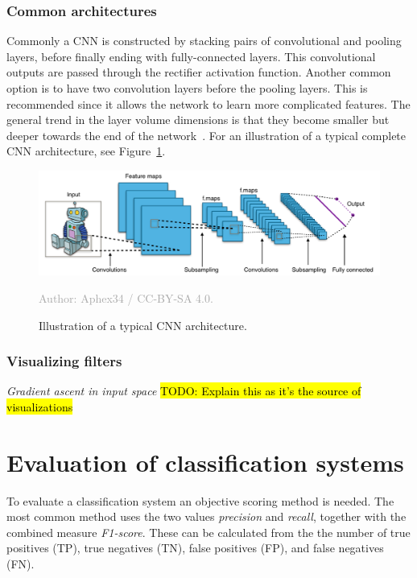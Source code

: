 \documentclass{kththesis}
\newcommand{\source}[1]{\vspace{-5mm}\caption*{\textcolor{darkgray}{Author: {#1}}\vspace{-7mm}} }
\begin{document}
\subsubsection{Common architectures}
Commonly a CNN is constructed by stacking pairs of convolutional and pooling layers, before finally ending with fully-connected layers. This convolutional outputs are passed through the rectifier activation function. Another common option is to have two convolution layers before the pooling layers. This is recommended since it allows the network to learn more complicated features. The general trend in the layer volume dimensions is that they become smaller but deeper towards the end of the network~\cite{cnnIntro}. For an illustration of a typical complete CNN architecture, see Figure~\ref{fig:typical_cnn}.

\begin{figure}
  \begin{center}
    \includegraphics[width=150mm]{img/typical_cnn.png}
    \caption{Illustration of a typical CNN architecture.}
    \source{Aphex34 / CC-BY-SA 4.0.}
    \label{fig:typical_cnn}
  \end{center}
\end{figure}

\subsubsection{Visualizing filters}
\textit{Gradient ascent in input space}
\hl{TODO: Explain this as it's the source of visualizations}

\section{Evaluation of classification systems}
To evaluate a classification system an objective scoring method is needed. The most common method uses the two values \textit{precision} and \textit{recall}, together with the combined measure \textit{F1-score}. These can be calculated from the the number of true positives (TP), true negatives (TN), false positives (FP), and false negatives (FN).
\end{document}
